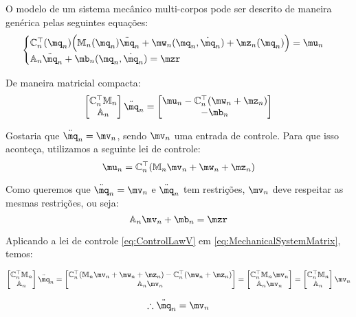 O modelo de um sistema mec\^anico multi-corpos pode ser descrito de maneira gen\'erica pelas seguintes equa\c{c}\~oes:
\begin{equation} \label{eq:MechanicalSystem}
\begin{cases}
\mC_n^\top (\mq_n) \Big( \mM_n (\mq_n) \ddot{\mq}_n + \mw_n (\mq_n, \dot{\mq}_n) + \mz_n (\mq_n) \Big) = \mu_n \\
\mA_n \ddot{\mq}_n + \mb_n (\mq_n, \dot{\mq}_n) = \mzr
\end{cases}
\end{equation}

De maneira matricial compacta:
\begin{equation} \label{eq:MechanicalSystemMatrix}
\begin{bmatrix}
\mC_n^\top \mM_n \\
\mA_n
\end{bmatrix}
\ddot{\mq}_n
=
\begin{bmatrix}
\mu_n - \mC_n^\top(\mw_n + \mz_n) \\
-\mb_n
\end{bmatrix}
\end{equation}

Gostaria que $ \ddot{\mq}_n = \mv_n $, sendo $\mv_n$ uma entrada de controle. Para que isso aconte\c{c}a, utilizamos a seguinte lei de controle:
\begin{equation} \label{eq:ControlLawV}
\mu_n = \mC_n^\top ( \mM_n \mv_n + \mw_n + \mz_n )
\end{equation}

Como queremos que $ \ddot{\mq}_n = \mv_n $ e $\ddot{\mq}_n$ tem restri\c{c}\~oes, $\mv_n$ deve respeitar as mesmas restri\c{c}\~oes, ou seja:
\begin{equation} \label{eq:ControlLawVRestriction}
\mA_n \mv_n + \mb_n = \mzr
\end{equation}

Aplicando a lei de controle \eqref{eq:ControlLawV} em \eqref{eq:MechanicalSystemMatrix}, temos:
\begin{center}
$ \begin{bmatrix}
\mC_n^\top \mM_n \\
\mA_n
\end{bmatrix}
\ddot{\mq}_n
=
\begin{bmatrix}
\mC_n^\top ( \mM_n \mv_n + \mw_n + \mz_n ) - \mC_n^\top(\mw_n + \mz_n) \\
\mA_n \mv_n
\end{bmatrix}
=
\begin{bmatrix}
\mC_n^\top  \mM_n \mv_n \\
\mA_n \mv_n
\end{bmatrix}
=
\begin{bmatrix}
\mC_n^\top \mM_n \\
\mA_n
\end{bmatrix}
\mv_n $
\end{center}
\begin{equation} \label{eq:ClosedLoopV}
\therefore \ddot{\mq}_n = \mv_n
\end{equation}


